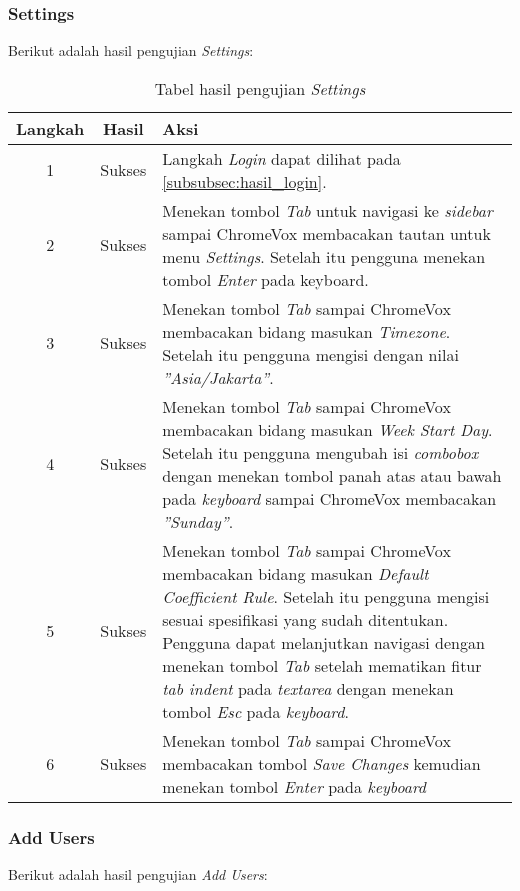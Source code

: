 \subsubsection{Settings}
\label{subsubsec:hasil_settings}
Berikut adalah hasil pengujian \textit{Settings}:

\begin{table}[H]
	\centering
	\caption{Tabel hasil pengujian \textit{Settings}}
	\label{tab:hasil_settings}
	\begin{tabular}{|c|c|p{12cm}|}
		\toprule
		Langkah & Hasil & Aksi\\
		\midrule
		1 & Sukses & Langkah \textit{Login} dapat dilihat pada \ref{subsubsec:hasil_login}.\\
		2 & Sukses & Menekan tombol \textit{Tab} untuk navigasi ke \textit{sidebar} sampai ChromeVox membacakan tautan untuk menu \textit{Settings}. Setelah itu pengguna menekan tombol \textit{Enter} pada keyboard.\\
		3 & Sukses & Menekan tombol \textit{Tab} sampai ChromeVox membacakan bidang masukan \textit{Timezone}. Setelah itu pengguna mengisi dengan nilai \textit{''Asia/Jakarta''}.\\
		4 & Sukses & Menekan tombol \textit{Tab} sampai ChromeVox membacakan bidang masukan \textit{Week Start Day}. Setelah itu pengguna mengubah isi \textit{combobox} dengan menekan tombol panah atas atau bawah pada \textit{keyboard} sampai ChromeVox membacakan \textit{''Sunday''}.\\
		5 & Sukses & Menekan tombol \textit{Tab} sampai ChromeVox membacakan bidang masukan \textit{Default Coefficient Rule}. Setelah itu pengguna mengisi sesuai spesifikasi yang sudah ditentukan. Pengguna dapat melanjutkan navigasi dengan menekan tombol \textit{Tab} setelah mematikan fitur \textit{tab indent} pada \textit{textarea} dengan menekan tombol \textit{Esc} pada \textit{keyboard}.\\
		6 & Sukses & Menekan tombol \textit{Tab} sampai ChromeVox membacakan tombol \textit{Save Changes} kemudian menekan tombol \textit{Enter} pada \textit{keyboard}\\
		\bottomrule
	\end{tabular}
\end{table}

\subsubsection{Add Users}
\label{subsubsec:hasil_add_users}
Berikut adalah hasil pengujian \textit{Add Users}:

